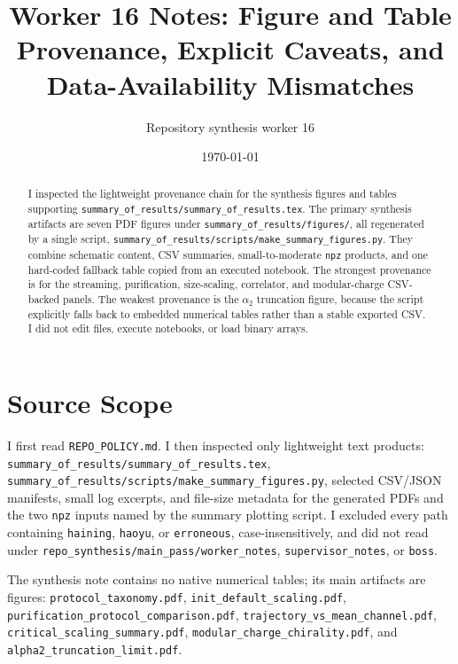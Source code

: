 \documentclass[aps,prb,onecolumn,nofootinbib,superscriptaddress]{revtex4-2}
\begin{document}
\title{Worker 16 Notes: Figure and Table Provenance, Explicit Caveats, and Data-Availability Mismatches}

\author{Repository synthesis worker 16}

\date{\today}

\begin{abstract}
I inspected the lightweight provenance chain for the synthesis figures and tables supporting
\texttt{summary\_of\_results/summary\_of\_results.tex}.  The primary synthesis artifacts are
seven PDF figures under \texttt{summary\_of\_results/figures/}, all regenerated by a single
script, \texttt{summary\_of\_results/scripts/make\_summary\_figures.py}.  They combine
schematic content, CSV summaries, small-to-moderate \texttt{npz} products, and one hard-coded
fallback table copied from an executed notebook.  The strongest provenance is for the
streaming, purification, size-scaling, correlator, and modular-charge CSV-backed panels.  The
weakest provenance is the $\alpha_2$ truncation figure, because the script explicitly falls
back to embedded numerical tables rather than a stable exported CSV.  I did not edit files,
execute notebooks, or load binary arrays.
\end{abstract}

\maketitle
\tableofcontents

\section{Source Scope}

I first read \texttt{REPO\_POLICY.md}.  I then inspected only lightweight text products:
\texttt{summary\_of\_results/summary\_of\_results.tex},
\texttt{summary\_of\_results/scripts/make\_summary\_figures.py}, selected CSV/JSON manifests,
small log excerpts, and file-size metadata for the generated PDFs and the two \texttt{npz}
inputs named by the summary plotting script.  I excluded every path containing
\texttt{haining}, \texttt{haoyu}, or \texttt{erroneous}, case-insensitively, and did not read
under \texttt{repo\_synthesis/main\_pass/worker\_notes}, \texttt{supervisor\_notes}, or
\texttt{boss}.

The synthesis note contains no native numerical tables; its main artifacts are figures:
\texttt{protocol\_taxonomy.pdf}, \texttt{init\_default\_scaling.pdf},
\texttt{purification\_protocol\_comparison.pdf},
\texttt{trajectory\_vs\_mean\_channel.pdf},
\texttt{critical\_scaling\_summary.pdf}, \texttt{modular\_charge\_chirality.pdf}, and
\texttt{alpha2\_truncation\_limit.pdf}.
\end{document}

